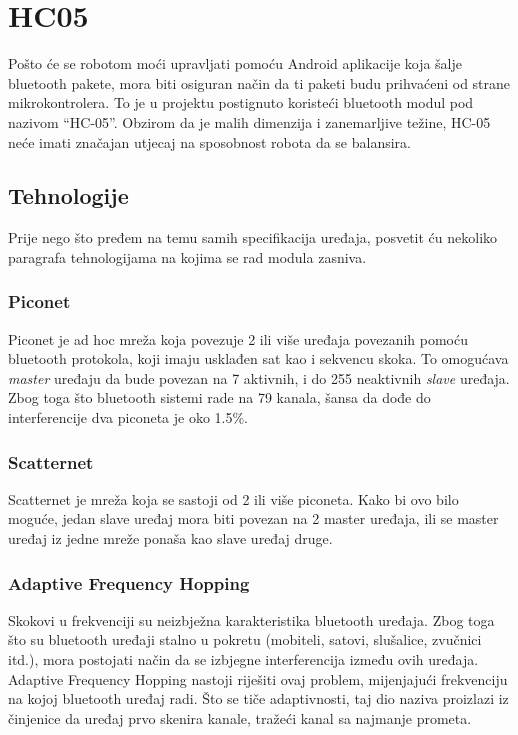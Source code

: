 \documentclass[../Document.tex]{subfiles}
\begin{document}
\section{HC05}
Pošto će se robotom moći upravljati pomoću Android aplikacije koja šalje bluetooth pakete, mora biti osiguran način da ti paketi budu prihvaćeni od strane mikrokontrolera. To je u projektu postignuto koristeći bluetooth modul pod nazivom ``HC-05''. Obzirom da je malih dimenzija i zanemarljive težine, HC-05 neće imati značajan utjecaj na sposobnost robota da se balansira.

\subsection{Tehnologije}
Prije nego što pređem na temu samih specifikacija uređaja, posvetit ću nekoliko paragrafa tehnologijama na kojima se rad modula zasniva.

\subsubsection{Piconet}
Piconet je ad hoc mreža koja povezuje 2 ili više uređaja povezanih pomoću bluetooth protokola, koji imaju usklađen sat kao i sekvencu skoka. To omogućava \textit{master} uređaju da bude povezan na 7 aktivnih, i do 255 neaktivnih \textit{slave} uređaja. Zbog toga što bluetooth sistemi rade na 79 kanala, šansa da dođe do interferencije dva piconeta je oko 1.5\%.
\vspace{1cm}

\subsubsection{Scatternet}
Scatternet je mreža koja se sastoji od 2 ili više piconeta. Kako bi ovo bilo moguće, jedan slave uređaj mora biti povezan na 2 master uređaja, ili se master uređaj iz jedne mreže ponaša kao slave uređaj druge.

\subsubsection{Adaptive Frequency Hopping}
Skokovi u frekvenciji su neizbježna karakteristika bluetooth uređaja. Zbog toga što su bluetooth uređaji stalno u pokretu (mobiteli, satovi, slušalice, zvučnici itd.), mora postojati način da se izbjegne interferencija između ovih uređaja. Adaptive Frequency Hopping nastoji riješiti ovaj problem, mijenjajući frekvenciju na kojoj bluetooth uređaj radi. Što se tiče adaptivnosti, taj dio naziva proizlazi iz činjenice da uređaj prvo skenira kanale, tražeći kanal sa najmanje prometa.
\end{document}
